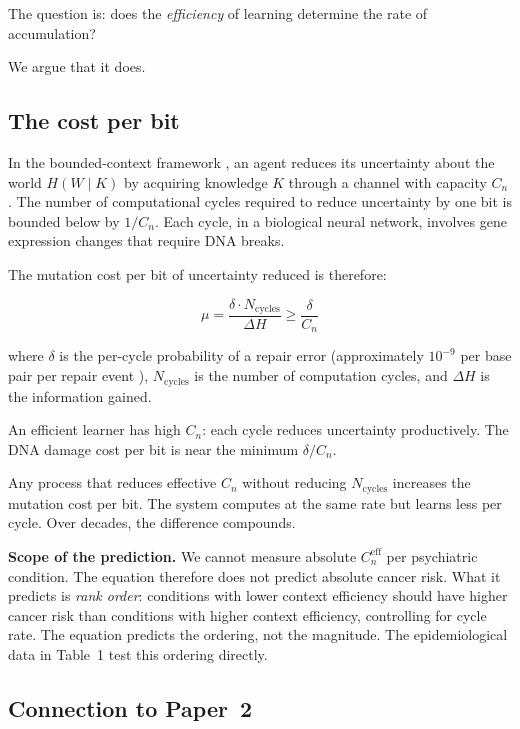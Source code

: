 \documentclass[11pt]{article}
\theoremstyle{definition}
\begin{document}
The question is: does the \emph{efficiency} of learning determine
the rate of accumulation?

We argue that it does.

\subsection{The cost per bit}

In the bounded-context framework \cite{McCarthy2026a}, an agent
reduces its uncertainty about the world $H(W \mid K)$ by acquiring
knowledge $K$ through a channel with capacity $C_n$. The number
of computational cycles required to reduce uncertainty by one bit
is bounded below by $1/C_n$. Each cycle, in a biological neural
network, involves gene expression changes that require DNA breaks.

The mutation cost per bit of uncertainty reduced is therefore:

\begin{equation}
\label{eq:cost}
\mu = \frac{\delta \cdot N_{\text{cycles}}}{\Delta H}
    \geq \frac{\delta}{C_n}
\end{equation}

where $\delta$ is the per-cycle probability of a repair error
(approximately $10^{-9}$ per base pair per repair event
\cite{Lindahl1993}), $N_{\text{cycles}}$ is the number of
computation cycles, and $\Delta H$ is the information gained.

An efficient learner has high $C_n$: each cycle reduces uncertainty
productively. The DNA damage cost per bit is near the minimum
$\delta / C_n$.

Any process that reduces effective $C_n$ without reducing
$N_{\text{cycles}}$ increases the mutation cost per bit.
The system computes at the same rate but learns less per cycle.
Over decades, the difference compounds.

\textbf{Scope of the prediction.}
We cannot measure absolute $C_n^{\text{eff}}$ per psychiatric
condition. The equation therefore does not predict absolute cancer
risk. What it predicts is \emph{rank order}: conditions with lower
context efficiency should have higher cancer risk than conditions
with higher context efficiency, controlling for cycle rate.
The equation predicts the ordering, not the magnitude. The
epidemiological data in Table~1 test this ordering directly.

\subsection{Connection to Paper~2}
\end{document}
